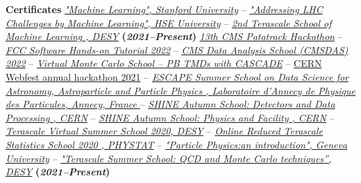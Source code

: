 \documentclass[11pt]{res}
\begin{document}
\begin{resume}
\textbf{Certificates}
\href{https://www.coursera.org/account/accomplishments/verify/DRRN6452E8WB?utm_product=course}{\textit{"Machine Learning", Stanford University}} -- \href{https://www.coursera.org/account/accomplishments/certificate/MY4HQAEAYL9D}{\textit{"Addressing LHC Challenges by Machine Learning",  HSE University}} -- \href{https://drive.google.com/file/d/11AAS10GLKvA5oR2oZmcjLj1YBwBevQue/view?usp=sharing}{\textit{2nd Terascale School of Machine Learning , DESY}} \textbf{(\textit{2021--Present})}
\href{https://indico.cern.ch/event/1246472/}{\textit{13th CMS Patatrack Hackathon}} -- \href{https://indico.cern.ch/event/1182767/}{\textit{FCC Software Hands-on Tutorial 2022}} -- \href{https://lpc.fnal.gov/programs/schools-workshops/cmsdas.shtml}{\textit{CMS Data Analysis School (CMSDAS) 2022}} -- \href{https://drive.google.com/file/d/1Ui4phtxuFPd-trfQp6jCmL4qZOgEJvlf/view}{\textit{Virtual Monte Carlo School -- PB TMDs with CASCADE}} -- \href{https://drive.google.com/file/d/14agcBsN5tkP3eKP2QEpU_cq4_jxhDvRT/view?usp=sharing}{CERN Webfest annual hackathon 2021} -- \href{https://drive.google.com/file/d/1D9BjE1nlL8UmRmZ3HQNqC6Cq1OxK0zB-/view?usp=sharing}{\textit{ESCAPE Summer School on Data Science for Astronomy, Astroparticle and Particle Physics , Laboratoire d’Annecy de Physique des Particules, Annecy, France }} -- \href{https://indico.cern.ch/event/964916/overview}{\textit{SHINE Autumn School: Detectors and Data Processing , CERN}} -- \href{https://indico.cern.ch/event/963826/}{\textit{SHINE Autumn School: Physics and Facility , CERN}} -- \href{https://indico.desy.de/event/26403/}{\textit{Terascale Virtual Summer School 2020, DESY}} -- \href{https://indico.desy.de/event/25594/}{\textit{Online Reduced Terascale Statistics School 2020 , PHYSTAT}} -- \href{https://www.coursera.org/account/accomplishments/certificate/CMVH65UHPLR3}{\textit{"Particle Physics:an introduction", Geneva University}} -- \href{https://drive.google.com/file/d/1fxuisoVa6oLr7eA6mWlE-xZxAs_ifsk6/view}{\textit{"Terascale Summer School: QCD and Monte Carlo techniques”, DESY}} \textbf{(\textit{2021--Present})}

\end{resume}
\end{document}

